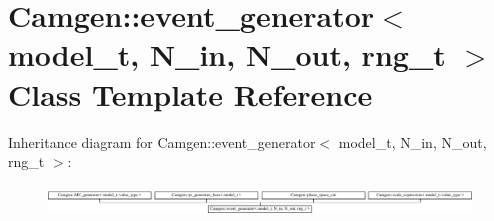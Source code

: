 \hypertarget{a00210}{\section{Camgen\-:\-:event\-\_\-generator$<$ model\-\_\-t, N\-\_\-in, N\-\_\-out, rng\-\_\-t $>$ Class Template Reference}
\label{a00210}
}
Inheritance diagram for Camgen\-:\-:event\-\_\-generator$<$ model\-\_\-t, N\-\_\-in, N\-\_\-out, rng\-\_\-t $>$\-:\begin{figure}[H]
\begin{center}
\leavevmode
\includegraphics[height=0.806916cm]{a00210}
\end{center}
\end{figure}
